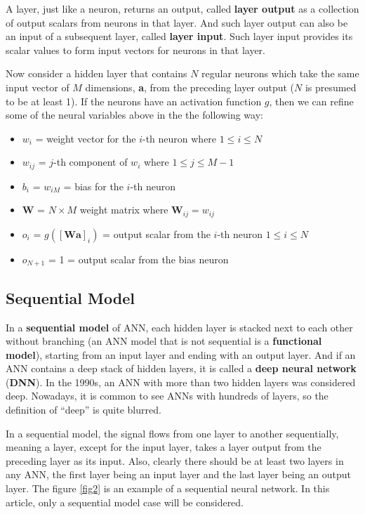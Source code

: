 \documentclass[letterpaper, 11pt]{article}
\numberwithin{equation}{section}
\numberwithin{figure}{section}
\numberwithin{table}{section}
\begin{document}
A layer, just like a neuron, returns an output, called \textbf{layer output} as a collection of output scalars from neurons in that layer. And such layer output can also be an input of a subsequent layer, called \textbf{layer input}. Such layer input provides its scalar values to form input vectors for neurons in that layer.

Now consider a hidden layer that contains \(N\) regular neurons which take the same input vector of \(M\) dimensions, \textbf{a}, from the preceding layer output (\(N\) is presumed to be at least 1). If the neurons have an activation function \(g\), then we can refine some of the neural variables above in the the following way:

\begin{itemize}
	\item \(w_{i}\) = weight vector for the \(i\)-th neuron where \(1 \le i \le N\)
	\item \(w_{ij}\) = \(j\)-th component of \(w_{i}\) where \(1 \le j \le M - 1\)
	\item \(b_{i}\) = \(w_{iM}\) = bias for the \(i\)-th neuron
	\item \textbf{W} = \(N \times M\) weight matrix where \(\textbf{W}_{ij} = w_{ij}\)  
	\item \(o_{i}\) = \(g([\textbf{Wa}]_{i})\) = output scalar from the \(i\)-th neuron \(1 \le i \le N\)
	\item \(o_{N+1}\) = 1 = output scalar from the bias neuron
\end{itemize}

\subsection{Sequential Model}
In a \textbf{sequential model} of ANN, each hidden layer is stacked next to each other without branching (an ANN model that is not sequential is a \textbf{functional model}), starting from an input layer and ending with an output layer. And if an ANN contains a deep stack of hidden layers, it is called a \textbf{deep neural network} (\textbf{DNN}). In the 1990s, an ANN with more than two hidden layers was considered deep. Nowadays, it is common to see ANNs with hundreds of layers, so the definition of “deep” is quite blurred.

In a sequential model, the signal flows from one layer to another sequentially, meaning a layer, except for the input layer, takes a layer output from the preceding layer as its input. Also, clearly there should be at least two layers in any ANN, the first layer being an input layer and the last layer being an output layer. The figure \ref{fig2} is an example of a sequential neural network. In this article, only a sequential model case will be considered.
\end{document}
